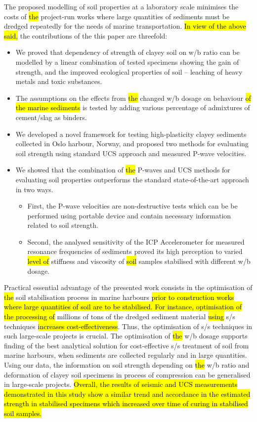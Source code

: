 \documentclass[sustainability,article,submit,pdftex,moreauthors]{Definitions/mdpi}
\begin{document}
The proposed modelling of soil properties at a laboratory scale minimises the costs of \hl{the }project-run works where large quantities of sediments must be dredged repeatedly for the needs of marine transportation. \hl{In view of the above said, }the contributions of the this paper are threefold:

\begin{itemize}
  \item We proved that dependency of strength of clayey soil on w/b ratio can be modelled by a linear combination of tested specimens showing the gain of strength, and the improved ecological properties of soil -- leaching of heavy metals and toxic substances. 
  \item The assumptions on the effects from \hl{the }changed w/b dosage on\hl{ }behaviour \hl{of the marine sediments }is tested by adding various percentage of admixtures of cement/slag as binders.
  \item We developed a novel framework for testing high-plasticity clayey sediments collected in Oslo harbour, Norway, and proposed two methods for evaluating soil strength using standard UCS approach and measured P-wave velocities. 
  \item We showed that the combination of \hl{the }P-waves and UCS methods for evaluating soil properties outperforms the standard state-of-the-art approach in two ways. 
  	\begin{itemize}
  		\item First, the P-wave velocities are non-destructive tests which can be be performed using portable device and contain necessary information related to soil strength. 
		\item Second, the analysed sensitivity of the ICP Accelerometer for measured resonance frequencies of sediments proved its high perception to varied \hl{level of }stiffness and viscosity of \hl{soil }samples stabilised with different w/b dosage.
	\end{itemize}
\end{itemize}

Practical essential advantage of the presented work consists in the optimisation of \hl{the }soil stabilisation process in marine harbours \hl{prior to construction works where large quantities of soil are to be stabilised. For instance, optimisation of the processing of }millions of tons of the dredged sediment material \hl{using} s/s techniques \hl{increases cost-effectiveness}. Thus, the optimisation of s/s techniques in such large-scale projects is crucial. The optimisation of \hl{the }w/b dosage supports finding of the best analytical solution for cost-effective s/s treatment of soil from marine harbours, when sediments are collected regularly and in large quantities. Using our data, the information on soil strength depending on \hl{the }w/b ratio and deformation of clayey soil specimens in process of compression can be generalised in large-scale projects. \hl{Overall,  the results of seismic and UCS measurements demonstrated in this study show a similar trend and accordance in the estimated strength in stabilised specimens which increased over time of curing in stabilised soil samples.}
\end{document}
